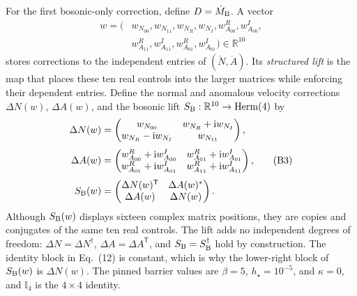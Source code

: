 \documentclass[10pt,letterpaper,twocolumn]{article}
\newcommand{\R}{\mathbb R}
\newcommand{\I}{\mathbb I}
\newcommand{\ii}{\mathrm i}
\begin{document}
For the first bosonic-only correction, define \(D=\dot M_{\rm B}\).  A vector
\[
\begin{aligned}
w=(&w_{N_{00}},w_{N_{11}},w_{N_R},w_{N_I},
w^R_{A_{00}},w^I_{A_{00}},\\
&w^R_{A_{11}},w^I_{A_{11}},w^R_{A_{01}},w^I_{A_{01}})
\in\R^{10}
\end{aligned}
\]
stores corrections to the independent entries of \((\dot N,\dot A)\).  Its
\emph{structured lift} is the map that places these ten real controls into
the larger matrices while enforcing their dependent entries.  Define the
normal and anomalous velocity corrections \(\Delta N(w)\), \(\Delta A(w)\),
and the bosonic lift \(S_{\rm B}:\R^{10}\to\operatorname{Herm}(4)\) by
\[
\begin{aligned}
\Delta N(w)&=
\begin{pmatrix}
w_{N_{00}}&w_{N_R}+\ii w_{N_I}\\
w_{N_R}-\ii w_{N_I}&w_{N_{11}}
\end{pmatrix},\\[3pt]
\Delta A(w)&=
\begin{pmatrix}
w^R_{A_{00}}+\ii w^I_{A_{00}}&w^R_{A_{01}}+\ii w^I_{A_{01}}\\
w^R_{A_{01}}+\ii w^I_{A_{01}}&w^R_{A_{11}}+\ii w^I_{A_{11}}
\end{pmatrix},\\[3pt]
S_{\rm B}(w)&=
\begin{pmatrix}
\Delta N(w)^{\mathsf T}&\Delta A(w)^\ast\\
\Delta A(w)&\Delta N(w)
\end{pmatrix}.
\end{aligned}
\tag{B3}
\]
Although \(S_{\rm B}(w)\) displays sixteen complex matrix positions, they are
copies and conjugates of the same ten real controls.  The lift adds no
independent degrees of freedom: \(\Delta N=\Delta N^\dagger\),
\(\Delta A=\Delta A^{\mathsf T}\), and \(S_{\rm B}=S_{\rm B}^\dagger\) hold
by construction.
The identity block in Eq.~(12) is constant, which is why the lower-right block
of \(S_{\rm B}(w)\) is \(\Delta N(w)\).  The pinned barrier values are
\(\beta=5\), \(h_\star=10^{-5}\), and \(\kappa=0\), and \(\I_4\) is the
\(4\times4\) identity.
\end{document}
